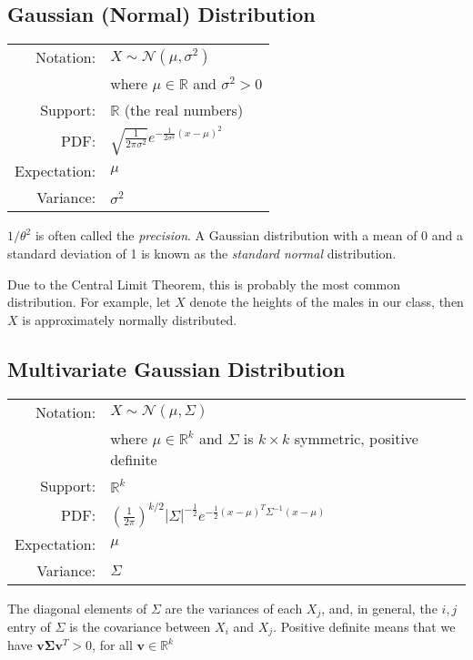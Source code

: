 \documentclass[twoside]{article}
\def\N{\mathcal{N}} %
\begin{document}
\subsection*{Gaussian (Normal) Distribution}
\begin{flushleft}
\def\arraystretch{1.1}
\begin{tabular}{rl}
Notation: & $X\sim \N(\mu,\sigma^2)$\\
& where $\mu \in\mathbb{R}$ and $\sigma^2 > 0$\\
Support:  & $\mathbb{R}$ (the real numbers)\\ 
PDF:   & $\sqrt{\frac{1}{2\pi\sigma^2}}e^{-\frac{1}{2\sigma^2}(x-\mu)^2}$\\ 
Expectation:  & $\mu$\\
Variance:  &  $\sigma^2$
\end{tabular}
\end{flushleft}
$1 / \theta^2$ is often called the \emph{precision}. A Gaussian distribution with a mean of 0 and a standard deviation of 1 is known as the \emph{standard normal} distribution. %

Due to the Central Limit Theorem, this is probably the most common distribution. For example, let $X$ denote the heights of the males in our class, then $X$ is approximately normally distributed.

\subsection*{Multivariate Gaussian Distribution}
\begin{flushleft}
\def\arraystretch{1.1}
\begin{tabular}{rl}
Notation: & $X\sim \N(\mu,\Sigma)$\\
& where $\mu \in\mathbb{R}^k$ and $\Sigma$ is $k\times k$ symmetric, positive definite\\
Support:  & $\mathbb{R}^k$\\ 
PDF:   & $\left(\frac{1}{2\pi}\right)^{k/2}|\Sigma|^{-\frac{1}{2}}e^{-\frac{1}{2}(x-\mu)^T\Sigma^{-1}(x-\mu)}$\\ 
Expectation:  & $\mu$\\
Variance:  &  $\Sigma$
\end{tabular}
\end{flushleft}
The diagonal elements of $\Sigma$ are the variances of each $X_j$, and, in general, the $i,j$ entry of $\Sigma$ is the covariance between $X_i$ and $X_j$. Positive definite means that we have $\bm{v}\bm{\Sigma}\bm{v}^{T} > 0$, for all $\bm{v} \in \mathbb{R}^{k}$
\end{document}
